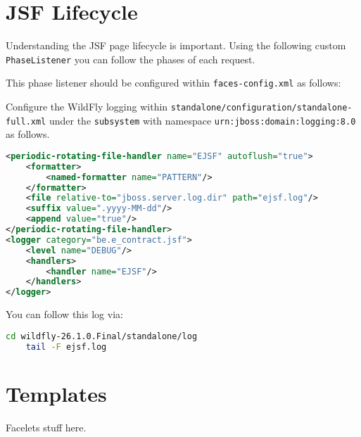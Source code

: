 \section{JSF Lifecycle}
Understanding the JSF page lifecycle is important.
Using the following custom \texttt{PhaseListener} you can follow the phases of each request.

This phase listener should be configured within \texttt{faces-config.xml} as follows:

Configure the WildFly logging within \texttt{standalone/configuration/standalone-full.xml} under the \texttt{subsystem} with namespace \texttt{urn:jboss:domain:logging:8.0} as follows.
\begin{lstlisting}[language=XML]
<periodic-rotating-file-handler name="EJSF" autoflush="true">
	<formatter>
		<named-formatter name="PATTERN"/>
	</formatter>
	<file relative-to="jboss.server.log.dir" path="ejsf.log"/>
	<suffix value=".yyyy-MM-dd"/>
	<append value="true"/>
</periodic-rotating-file-handler>
<logger category="be.e_contract.jsf">
	<level name="DEBUG"/>
	<handlers>
		<handler name="EJSF"/>
	</handlers>
</logger>
\end{lstlisting}
You can follow this log via:
\begin{lstlisting}[language=bash]
	cd wildfly-26.1.0.Final/standalone/log
	tail -F ejsf.log
\end{lstlisting}

\section{Templates}

Facelets stuff here.